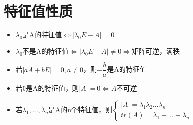 \section{特征值性质}
\begin{itemize}
    \item \(\lambda_0\)是A的特征值\(\Leftrightarrow |\lambda_0E - A| = 0\)
    \item \(\lambda_0\)不是A的特征值\(\Leftrightarrow |\lambda_0E - A| \neq 0 \Leftrightarrow\)矩阵可逆，满秩
    \item 若\(|aA + bE| = 0, a \neq 0\)，则\(-\dfrac{b}{a}\)是A的特征值
    \item 若0是A的特征值，则\(|A| = 0 \Leftrightarrow A\text{不可逆}\)
    \item 若\(\lambda_1, ..., \lambda_n\)是A的n个特征值，则\(\begin{cases}
        |A| = \lambda_1\lambda_2...\lambda_n \\ 
        tr(A) = \lambda_1 + ... + \lambda_n
    \end{cases}\)
\end{itemize}

